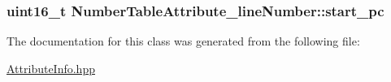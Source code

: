 \subsubsection[{\texorpdfstring{start\+\_\+pc}{start_pc}}]{\setlength{\rightskip}{0pt plus 5cm}uint16\+\_\+t Number\+Table\+Attribute\+\_\+line\+Number\+::start\+\_\+pc}\hypertarget{class_number_table_attribute__line_number_a2ede9887ca805349c8edc876dbc4d0da}{}\label{class_number_table_attribute__line_number_a2ede9887ca805349c8edc876dbc4d0da}


The documentation for this class was generated from the following file\+:\begin{DoxyCompactItemize}
\item 
\hyperlink{_attribute_info_8hpp}{Attribute\+Info.\+hpp}\end{DoxyCompactItemize}
